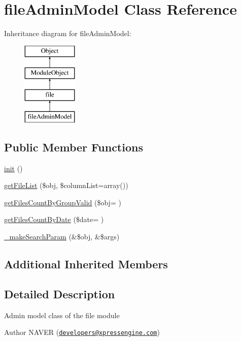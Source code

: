 \hypertarget{classfileAdminModel}{}\section{file\+Admin\+Model Class Reference}
\label{classfileAdminModel}
Inheritance diagram for file\+Admin\+Model\+:\begin{figure}[H]
\begin{center}
\leavevmode
\includegraphics[height=4.000000cm]{classfileAdminModel}
\end{center}
\end{figure}
\subsection*{Public Member Functions}
\begin{DoxyCompactItemize}
\item 
\hyperlink{classfileAdminModel_a043ae7934f6fb3bb6ef24bff36a63795}{init} ()
\item 
\hyperlink{classfileAdminModel_a19433395ef400eaf33876d93db918a29}{get\+File\+List} (\$obj, \$column\+List=array())
\item 
\hyperlink{classfileAdminModel_a0523b70f599166913414c375318bcc83}{get\+Files\+Count\+By\+Group\+Valid} (\$obj= \textquotesingle{}\textquotesingle{})
\item 
\hyperlink{classfileAdminModel_a2cff52618c56e1ebae4e392646c859e8}{get\+Files\+Count\+By\+Date} (\$date= \textquotesingle{}\textquotesingle{})
\item 
\hyperlink{classfileAdminModel_a2da869c66512ff677a71674030c8637c}{\+\_\+make\+Search\+Param} (\&\$obj, \&\$args)
\end{DoxyCompactItemize}
\subsection*{Additional Inherited Members}


\subsection{Detailed Description}
Admin model class of the file module \begin{DoxyAuthor}{Author}
N\+A\+V\+E\+R (\href{mailto:developers@xpressengine.com}{\tt developers@xpressengine.\+com}) 
\end{DoxyAuthor}


